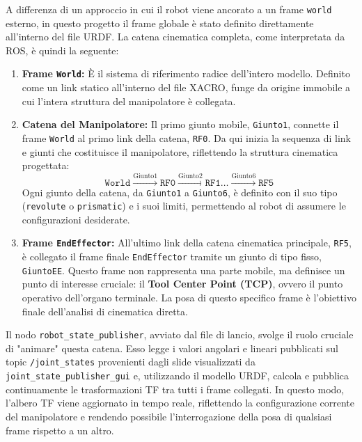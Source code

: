 \documentclass[11pt, a4paper]{report}
\begin{document}
A differenza di un approccio in cui il robot viene ancorato a un frame \texttt{world} esterno, in questo progetto il frame globale è stato definito direttamente all'interno del file URDF.
La catena cinematica completa, come interpretata da ROS, è quindi la seguente:
\begin{enumerate}
    \item \textbf{Frame \texttt{World}:} È il sistema di riferimento radice dell'intero modello. Definito come un link statico all'interno del file XACRO, funge da origine immobile a cui l'intera struttura del manipolatore è collegata.
    \item \textbf{Catena del Manipolatore:} Il primo giunto mobile, \texttt{Giunto1}, connette il frame \texttt{World} al primo link della catena, \texttt{RF0}. Da qui inizia la sequenza di link e giunti che costituisce il manipolatore, riflettendo la struttura cinematica progettata:
    \[
        \texttt{World} \xrightarrow{\text{Giunto1}} \texttt{RF0} \xrightarrow{\text{Giunto2}} \texttt{RF1} \dots \xrightarrow{\text{Giunto6}} \texttt{RF5}
    \]
    Ogni giunto della catena, da \texttt{Giunto1} a \texttt{Giunto6}, è definito con il suo tipo (\texttt{revolute} o \texttt{prismatic}) e i suoi limiti, permettendo al robot di assumere le configurazioni desiderate.
    \item \textbf{Frame \texttt{EndEffector}:} All'ultimo link della catena cinematica principale, \texttt{RF5}, è collegato il frame finale \texttt{EndEffector} tramite un giunto di tipo fisso, \texttt{GiuntoEE}. Questo frame non rappresenta una parte mobile, ma definisce un punto di interesse cruciale: il \textbf{Tool Center Point (TCP)}, ovvero il punto operativo dell'organo terminale. La posa di questo specifico frame è l'obiettivo finale dell'analisi di cinematica diretta.
\end{enumerate}

Il nodo \texttt{robot\_state\_publisher}, avviato dal file di lancio, svolge il ruolo cruciale di "animare" questa catena. Esso legge i valori angolari e lineari pubblicati sul topic \texttt{/joint\_states} provenienti dagli slide visualizzati da \texttt{joint\_state\_publisher\_gui} e, utilizzando il modello URDF, calcola e pubblica continuamente le trasformazioni TF tra tutti i frame collegati. In questo modo, l'albero TF viene aggiornato in tempo reale, riflettendo la configurazione corrente del manipolatore e rendendo possibile l'interrogazione della posa di qualsiasi frame rispetto a un altro.


\end{document}
